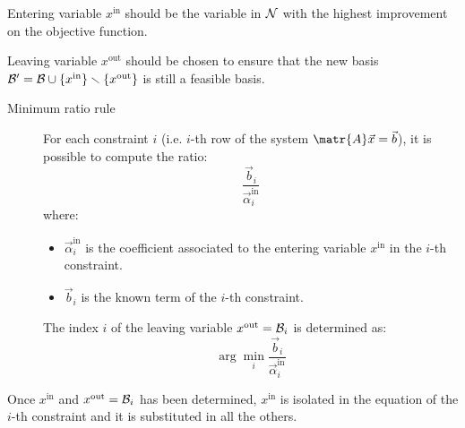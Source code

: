 \begin{descriptionlist}
    \item[Entering variable] 
        $x^\text{in}$ should be the variable in $\mathcal{N}$ with the highest improvement on the objective function.

    \item[Leaving variable] 
        $x^\text{out}$ should be chosen to ensure that the new basis $\mathcal{B}' = \mathcal{B} \cup \{ x^\text{in} \} \smallsetminus \{ x^\text{out} \}$
        is still a feasible basis.

        \begin{description}
            \item[Minimum ratio rule] 
                For each constraint $i$ (i.e. $i$-th row of the system $\matr{A}\vec{x} = \vec{b}$), it is possible to compute the ratio:
                \[ \frac{\vec{b}_i}{\vec{\alpha}_i^\text{in}} \]
                where:
                \begin{itemize}
                    \item $\vec{\alpha}_i^\text{in}$ is the coefficient associated to the entering variable $x^\text{in}$ in the $i$-th constraint.
                    \item $\vec{b}_i$ is the known term of the $i$-th constraint.
                \end{itemize}

                The index $i$ of the leaving variable $x^\text{out} = \mathcal{B}_i$ is determined as: 
                \[ \arg\min_i \frac{\vec{b}_i}{\vec{\alpha}_i^\text{in}} \]
        \end{description}
\end{descriptionlist}

Once $x^\text{in}$ and $x^\text{out} = \mathcal{B}_i$ has been determined, 
$x^\text{in}$ is isolated in the equation of the $i$-th constraint and it is substituted in all the others.

